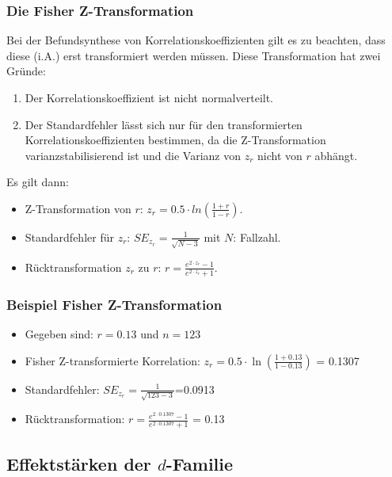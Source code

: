 \begin{frame}\frametitle{Die Fisher Z-Transformation}
  Bei der Befundsynthese von Korrelationskoeffizienten gilt es zu beachten, dass diese (i.A.) erst transformiert werden
  müssen. Diese Transformation hat zwei Gründe:
  \begin{enumerate}[<+->]
  \item Der Korrelationskoeffizient ist nicht normalverteilt.
  \item Der Standardfehler lässt sich nur für den transformierten Korrelationskoeffizienten bestimmen, da die
    Z-Transformation varianzstabilisierend ist und die Varianz von $z_r$ nicht von $r$ abhängt.
  \end{enumerate}
  \pause
  Es gilt dann:
  \begin{itemize}[<+->]
  \item Z-Transformation von $r$: $z_r=0.5 \cdot ln(\frac{1+r}{1-r})$.
  \item Standardfehler für $z_r$: $SE_{z_r}=\frac{1}{\sqrt{N-3}}$ mit $N$: Fallzahl.
  \item Rücktransformation $z_r$ zu $r$: $r=\frac{e^{2 \cdot z_r}-1}{e^{2 \cdot z_r}+1}$.
  \end{itemize}
\end{frame}


\begin{frame}\frametitle{Beispiel Fisher Z-Transformation}
  
  \begin{itemize}
  \item Gegeben sind: $r=0.13$ und $n=123$
  \item Fisher Z-transformierte Korrelation: $z_r = 0.5 \cdot
    \ln(\frac{1+0.13}{1-0.13})$ = 0.1307
  \item Standardfehler:
    $SE_{z_r}=\frac{1}{\sqrt{123-3}}$=0.0913
  \item Rücktransformation: $r=\frac{e^{2 \cdot 0.1307} -1}{e^{2 \cdot 0.1307} +
      1}$ = 0.13
  \end{itemize}
  
\end{frame}


\subsection{Effektstärken der $d$-Familie}

